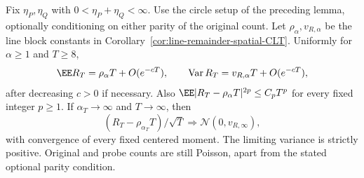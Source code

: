 \documentclass[11pt,letterpaper]{article}
\begin{document}
\begin{theorem}
\label{thm:Poisson-circle-remainder-CLT}
Fix $\eta_P,\eta_Q$ with $0<\eta_P+\eta_Q<\infty$.
Use the circle setup of the preceding lemma, optionally
conditioning on either parity of the original count.
Let $\rho_\alpha,v_{R,\alpha}$ be the line block constants
in Corollary~\ref{cor:line-remainder-spatial-CLT}.
Uniformly for $\alpha\ge1$ and $T\ge8$,
\begin{equation}\label{eq:Poisson-circle-remainder-moments}
 \EE R_T=\rho_\alpha T+O(e^{-cT}),\qquad
 \operatorname{Var}R_T=v_{R,\alpha}T+O(e^{-cT}),
\end{equation}
after decreasing $c>0$ if necessary. Also
$\EE|R_T-\rho_\alpha T|^{2p}\le C_p T^p$ for every fixed
integer $p\ge1$. If $\alpha_T\to\infty$
and $T\to\infty$, then
\[
 (R_T-\rho_{\alpha_T}T)/\sqrt T
                  \Longrightarrow\mathcal N(0,v_{R,\infty}),
\]
with convergence of every fixed centered moment. The limiting
variance is strictly positive. Original and probe counts are
still Poisson, apart from the stated optional parity condition.
\end{theorem}
\end{document}
